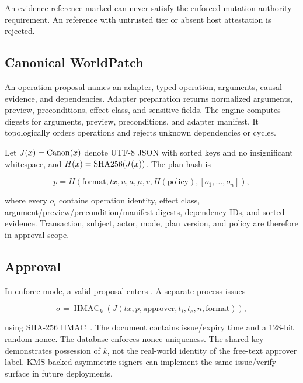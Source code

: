  An evidence reference marked  can never satisfy the enforced-mutation authority requirement. An  reference with untrusted tier or absent host attestation is rejected.

\subsection{Canonical WorldPatch}

An operation proposal names an adapter, typed operation, arguments, causal evidence, and dependencies. Adapter preparation returns normalized arguments, preview, preconditions, effect class, and sensitive fields. The engine computes digests for arguments, preview, preconditions, and adapter manifest. It topologically orders operations and rejects unknown dependencies or cycles.

Let $J(x)=\operatorname{Canon}(x)$ denote UTF-8 JSON with sorted keys and no insignificant whitespace, and $H(x)=\operatorname{SHA256}(J(x))$. The plan hash is

\begin{equation}
p=H(\mathrm{format},tx,u,a,\mu,v,H(\mathrm{policy}),[o_1,\ldots,o_n]),
\label{eq:planhash}
\end{equation}

where every $o_i$ contains operation identity, effect class, argument/preview/precondition/manifest digests, dependency IDs, and sorted evidence. Transaction, subject, actor, mode, plan version, and policy are therefore in approval scope.

\subsection{Approval}

In enforce mode, a valid proposal enters . A separate process issues

\begin{equation}
\sigma=\operatorname{HMAC}_{k}(J(tx,p,\mathrm{approver},t_i,t_e,n,\mathrm{format})),
\label{eq:approval}
\end{equation}

using SHA-256 HMAC~\cite{krawczyk1997hmac}. The document contains issue/expiry time and a 128-bit random nonce. The database enforces nonce uniqueness. The shared key demonstrates possession of $k$, not the real-world identity of the free-text approver label. KMS-backed asymmetric signers can implement the same issue/verify surface in future deployments.

